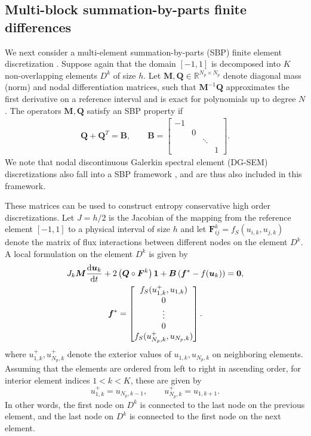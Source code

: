 \documentclass{article}
\newcommand{\td}[2]{\frac{{\rm d}#1}{{\rm d}{ {#2}}}}
\newcommand{\LRp}[1]{\left( #1 \right)}
\newcommand{\eqlab}[1]{\begin{align}#1\end{align}}
\newcommand{\bmat}[1]{\begin{bmatrix}#1\end{bmatrix}}
\begin{document}
\subsection{Multi-block summation-by-parts finite differences}

We next consider a multi-element summation-by-parts (SBP) finite element discretization \cite{kreiss1974finite, carpenter1999stable}.  Suppose again that the domain $[-1,1]$ is decomposed into $K$ non-overlapping elements $D^k$ of size $h$.  Let ${\bm{M}}, {\bm{Q}} \in \mathbb{R}^{N_p\times N_p}$ denote diagonal mass (norm) and nodal differentiation matrices, such that ${\bm{M}}^{-1}{\bm{Q}}$ approximates the first derivative on a reference interval and is exact for polynomials up to degree $N$.  The operators ${\bm{M}}, {\bm{Q}}$ satisfy an SBP property if
\eqlab{
{\bm{Q}}+{\bm{Q}}^T = {\bm{B}}, \qquad 
{\bm{B}} = \bmat{
-1 & & & \\
& 0 & & \\
& & \ddots & \\
& & & 1 
}.
\label{eq:fvQ}
}
We note that nodal discontinuous Galerkin spectral element (DG-SEM) discretizations \cite{kopriva2009implementing} also fall into a SBP framework \cite{gassner2013skew}, and are thus also included in this framework.  

These matrices can be used to construct entropy conservative high order discretizations.  Let $J = h/2$ is the Jacobian of the mapping from the reference element $[-1,1]$ to a physical interval of size $h$ and let $\bm{F}^k_{ij} = f_S(u_{i,k},u_{j,k})$ denote the matrix of flux interactions between different nodes on the element $D^k$.  A local formulation on the element $D^k$ is given by
\begin{gather}
J_k {\bm{M}} \td{\bm{u}_k}{t} + 2\LRp{{\bm{Q}} \circ \bm{F}^k}\bm{1} + \bm{B}\LRp{\bm{f}^*-f(\bm{u}_k)}  = \bm{0}, \nonumber\\
\bm{f}^* = \bmat{
f_S(u_{1,k}^+,u_{1,k})\\
0\\
\vdots\\
0\\
f_S(u_{N_p,k}^+,u_{N_p,k})
}.
\label{eq:sbp1D}
\end{gather}
where $u_{1,k}^+, u_{N_p,k}^+$ denote the exterior values of $u_{1,k}, u_{N_p,k}$ on neighboring elements.  Assuming that the elements are ordered from left to right in ascending order, for interior element indices $1 < k < K$, these are given by
\[
u_{1,k}^+ = u_{N_p,k-1}, \qquad u_{N_p,k}^+ = u_{1,k+1}.
\]
In other words, the first node on $D^k$ is connected to the last node on the previous element, and the last node on $D^k$ is connected to the first node on the next element.
\end{document}
